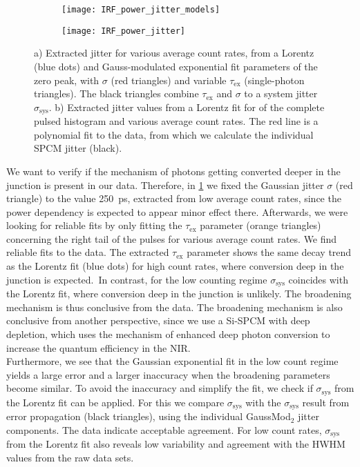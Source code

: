 \begin{figure}[htp]
	\centering
	\begin{subfigure}{0.49\linewidth}
		\centering
		\texttt{[image: IRF\_power\_jitter\_models]}
		\caption{}
		\label{fig:IRF_power_jitter_models}
	\end{subfigure}
	\hfill
	\begin{subfigure}{0.485\linewidth}
		\centering
		\texttt{[image: IRF\_power\_jitter]}
		\caption{}
		\label{fig:IRF_power_jitter}
	\end{subfigure}
	\caption{a) Extracted jitter for various average count rates, from a Lorentz (blue dots) and Gauss-modulated exponential fit parameters of the zero peak, with $\sigma$ (red triangles) and variable $\tau_\mathrm{ex}$ (single-photon triangles). The black triangles combine $\tau_\mathrm{ex}$ and $\sigma$ to a system jitter $\sigma_\mathrm{sys}$. b) Extracted jitter values from a Lorentz fit for of the complete pulsed histogram and various average count rates. The red line is a polynomial fit to the data, from which we calculate the individual \ac{SPCM} jitter (black).}
\end{figure}
\noindent We want to verify if the mechanism of photons getting converted deeper in the junction is present in our data. Therefore, in \cref{fig:IRF_power_jitter_models} we fixed the Gaussian jitter $\sigma$ (red triangle) to the value \SI{250}{\ps}, extracted from low average count rates, since the power dependency is expected to appear minor effect there. Afterwards, we were looking for reliable fits by only fitting the $\tau_\mathrm{ex}$ parameter (orange triangles) concerning the right tail of the pulses for various average count rates. We find reliable fits to the data. The extracted $\tau_\mathrm{ex}$ parameter shows the same decay trend as the Lorentz fit (blue dots) for high count rates, where conversion deep in the junction is expected.~In contrast, for the low counting regime $\sigma_\mathrm{sys}$ coincides with the Lorentz fit, where conversion deep in the junction is unlikely. The broadening mechanism is thus conclusive from the data. The broadening mechanism is also conclusive from another perspective, since we use a Si-\ac{SPCM} with deep depletion, which uses the mechanism of enhanced deep photon conversion to increase the quantum efficiency in the NIR.\\
Furthermore, we see that the Gaussian exponential fit in the low count regime yields a large error and a larger inaccuracy when the broadening parameters become similar. To avoid the inaccuracy and simplify the fit, we check if $\sigma_\mathrm{sys}$ from the Lorentz fit can be applied. For this we compare $\sigma_\mathrm{sys}$ with the $\sigma_\mathrm{sys}$ result from error propagation (black triangles), using the individual GaussMod$_2$ jitter components. The data indicate acceptable agreement. For low count rates, $\sigma_\mathrm{sys}$ from the Lorentz fit also reveals low variability and agreement with the \ac{HWHM} values from the raw data sets.\\

